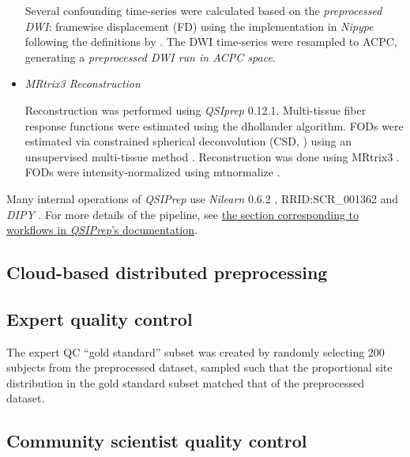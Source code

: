 \documentclass[fleqn,10pt]{wlscirep}
\begin{document}
\begin{itemize}
Several confounding time-series were calculated based on the
\emph{preprocessed DWI}: framewise displacement (FD) using the implementation
in \emph{Nipype} following the definitions by \cite{power_fd_dvars}. The DWI
time-series were resampled to ACPC, generating a \emph{preprocessed DWI run
in ACPC space}.

\item {\it MRtrix3 Reconstruction}

Reconstruction was performed using \emph{QSIprep} 0.12.1. Multi-tissue fiber response functions were estimated using the dhollander algorithm. FODs were estimated via constrained spherical deconvolution (CSD, \cite{originalcsd, tournier2008csd}) using an unsupervised multi-tissue method \cite{dhollander2019response, dhollander2016unsupervised}. Reconstruction was done using MRtrix3 \cite{mrtrix3}. FODs were intensity-normalized using mtnormalize \cite{mtnormalize}.

\end{itemize}

Many internal operations of \emph{QSIPrep} use \emph{Nilearn} 0.6.2 \cite{nilearn}, RRID:SCR\_001362 and \emph{DIPY} \cite{dipy}. For more details of the pipeline, see \href{https://qsiprep.readthedocs.io/en/latest/workflows.html}{the section corresponding to workflows in \emph{QSIPrep}'s documentation}.

\subsection*{Cloud-based distributed preprocessing}


\subsection*{Expert quality control}

The expert QC ``gold standard'' subset was created by randomly selecting 200 subjects from the preprocessed dataset, sampled such that the proportional site distribution in the gold standard subset matched that of the preprocessed dataset.


\subsection*{Community scientist quality control}
\end{document}
